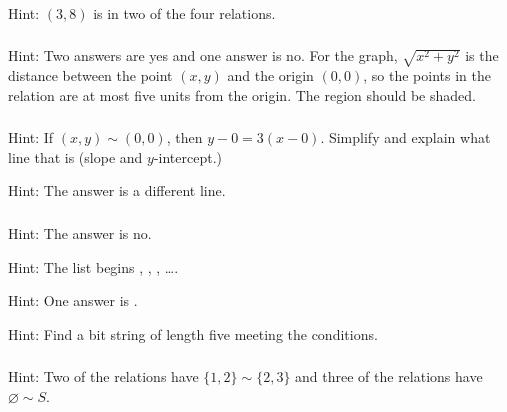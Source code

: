 \subsubsection*{ \answers}
Hint: $(3,8)$ is in two of the four relations.

\subsubsection*{ \answers}
Hint: Two answers are yes and one answer is no.  For the graph, $\sqrt{x^2 + y^2}$ is the distance between the point $(x,y)$ and the origin $(0,0)$, so the points in the relation are at most five units from the origin.  The region should be shaded.

\subsubsection*{ \answers}
\begin{apart}
    \item Hint: If $(x,y) \sim (0,0)$, then $y-0=3(x-0)$.  Simplify and explain what line that is (slope and $y$-intercept.)
    \item Hint: The answer is a different line.
\end{apart}

\subsubsection*{ \answers}
\begin{apart}
    \item Hint: The answer is no.
    \item Hint: The list begins , , , \ldots.
    \item Hint: One answer is .
    \item Hint: Find a bit string of length five meeting the conditions.
\end{apart}

\subsubsection*{ \answers}
Hint: Two of the relations have $\{1,2\} \sim \{2,3\}$ and three of the relations have $\varnothing \sim S$.
